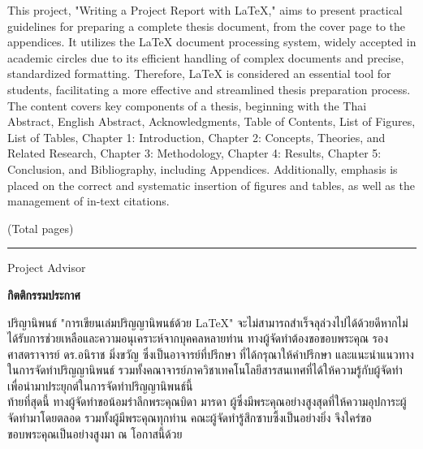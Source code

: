 \hspace*{1.5em} %
This project, "Writing a Project Report with LaTeX," aims to present practical guidelines for preparing a complete thesis document, from the cover page to the appendices. It utilizes the LaTeX document processing system, widely accepted in academic circles due to its efficient handling of complex documents and precise, standardized formatting. Therefore, LaTeX is considered an essential tool for students, facilitating a more effective and streamlined thesis preparation process. The content covers key components of a thesis, beginning with the Thai Abstract, English Abstract, Acknowledgments, Table of Contents, List of Figures, List of Tables, Chapter 1: Introduction, Chapter 2: Concepts, Theories, and Related Research, Chapter 3: Methodology, Chapter 4: Results, Chapter 5: Conclusion, and Bibliography, including Appendices. Additionally, emphasis is placed on the correct and systematic insertion of figures and tables, as well as the management of in-text citations.

\begin{flushright}
(Total \pageref{LastPage} pages)

\vfill

\rule{12 cm}{0.4pt} Project Advisor

\end{flushright}


\newpage
{}
{}
\begin{center}\textbf{กิตติกรรมประกาศ}\end{center}

\hspace*{1.5em}  %
ปริญานิพนธ์ "การเขียนเล่มปริญญานิพนธ์ด้วย LaTeX" จะไม่สามารถสำเร็จลุล่วงไปได้ด้วยดีหากไม่ได้รับการช่วยเหลือและความอนุเคราะห์จากบุคคลหลายท่าน ทางผู้จัดทำต้องขอขอบพระคุณ รองศาสตราจารย์ ดร.อนิราช มิ่งขวัญ ซึ่งเป็นอาจารย์ที่ปรึกษา ที่ได้กรุณาให้คำปรึกษา และแนะนำแนวทางในการจัดทำปริญญานิพนธ์ รวมทั้งคณาจารย์ภาควิชาเทคโนโลยีสารสนเทศที่ได้ให้ความรู้กับผู้จัดทำเพื่อนำมาประยุกต์ในการจัดทำปริญญานิพนธ์นี้ 
\\
\hspace*{1.5em}  %
ท้ายที่สุดนี้ ทางผู้จัดทำขอน้อมรำลึกพระคุณบิดา มารดา ผู้ซึ่งมีพระคุณอย่างสูงสุดที่ให้ความอุปการะผู้จัดทำมาโดยตลอด รวมทั้งผู้มีพระคุณทุกท่าน คณะผู้จัดทำรู้สึกซาบซึ้งเป็นอย่างยิ่ง จึงใคร่ขอขอบพระคุณเป็นอย่างสูงมา ณ โอกาสนี้ด้วย
\\
\begin{flushright}

\end{flushright}
